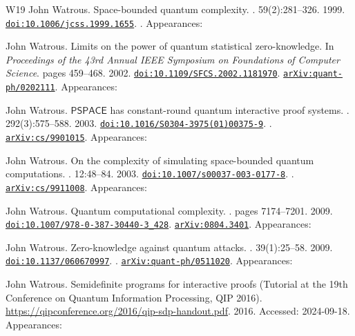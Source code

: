 \documentclass[10pt,a4paper]{article}
\numberwithin{equation}{section}
\numberwithin{figure}{section}
\begin{document}
\begin{thebibliography}{{}W19}
John Watrous.
\newblock Space-bounded quantum complexity.
. 59(2):281--326. 1999.
\newblock \href {https://doi.org/10.1006/jcss.1999.1655} {\texttt{doi:10.1006/jcss.1999.1655}}. . Appearances:\!

John Watrous.
\newblock Limits on the power of quantum statistical zero-knowledge.
\newblock In {\em Proceedings of the 43rd Annual IEEE Symposium on Foundations of Computer Science}. pages 459--468. 2002.
\newblock \href {https://doi.org/10.1109/SFCS.2002.1181970} {\texttt{doi:10.1109/SFCS.2002.1181970}}. \href {https://arxiv.org/abs/quant-ph/0202111} {\texttt{arXiv:quant-ph/0202111}}. Appearances:\!

John Watrous.
\newblock $\mathsf{PSPACE}$ has constant-round quantum interactive proof systems.
. 292(3):575--588. 2003.
\newblock \href {https://doi.org/10.1016/S0304-3975(01)00375-9} {\texttt{doi:10.1016/S0304-3975(01)00375-9}}. . \href {https://arxiv.org/abs/cs/9901015} {\texttt{arXiv:cs/9901015}}. Appearances:\!

John Watrous.
\newblock On the complexity of simulating space-bounded quantum computations.
. 12:48--84. 2003.
\newblock \href {https://doi.org/10.1007/s00037-003-0177-8} {\texttt{doi:10.1007/s00037-003-0177-8}}. . \href {https://arxiv.org/abs/cs/9911008} {\texttt{arXiv:cs/9911008}}. Appearances:\!

John Watrous.
\newblock Quantum computational complexity.
. pages 7174--7201. 2009.
\newblock \href {https://doi.org/10.1007/978-0-387-30440-3\_428} {\texttt{doi:10.1007/978-0-387-30440-3\_428}}. \href {https://arxiv.org/abs/0804.3401} {\texttt{arXiv:0804.3401}}. Appearances:\!

John Watrous.
\newblock Zero-knowledge against quantum attacks.
. 39(1):25--58. 2009.
\newblock \href {https://doi.org/10.1137/060670997} {\texttt{doi:10.1137/060670997}}. . \href {https://arxiv.org/abs/quant-ph/0511020} {\texttt{arXiv:quant-ph/0511020}}. Appearances:\!

John Watrous.
\newblock Semidefinite programs for interactive proofs {(Tutorial at the 19th Conference on Quantum Information Processing, QIP 2016)}.
\newblock \url{https://qipconference.org/2016/qip-sdp-handout.pdf}. 2016.
\newblock Accessed: 2024-09-18. Appearances:\!


\end{thebibliography}
\end{document}
